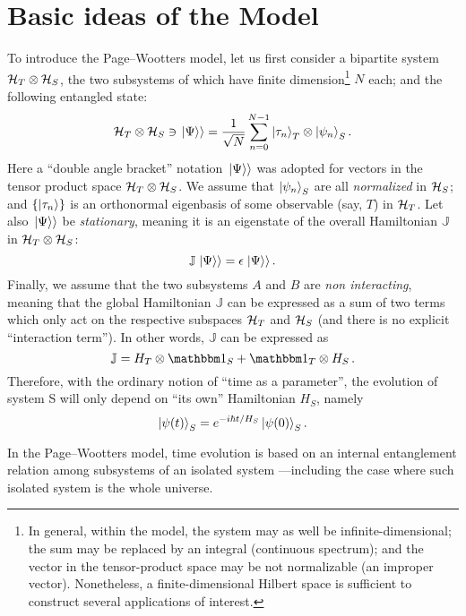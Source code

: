 \section{Basic ideas of the Model}

To introduce the Page--Wootters model, let us first consider
a bipartite system $\mathcal{H}_T \otimes \mathcal{H}_S$,
the two subsystems of which have finite dimension\footnote{
  In general, within the model,
  the system may as well be infinite-dimensional;
  the sum may be replaced by an integral (continuous spectrum);
  and the vector in the tensor-product space may be not normalizable (an improper vector).
  Nonetheless, a finite-dimensional Hilbert space is sufficient to construct several applications of interest.
} $N$ each;
and the following entangled state:
\begin{equation}\label{eq:pw:finite-entanglement}
  \mathcal{H}_T \otimes \mathcal{H}_S \ni \left.\left| \Psi \right\rangle\right\rangle
  =
  \frac{1}{\sqrt{N}} \sum_{n=0}^{N-1} \ket{\tau_{n}}_{T} \otimes \ket{\psi_{n}}_{S} \text{.}
\end{equation}
Here
a ``double angle bracket'' notation $\left.\left| \Psi \right\rangle\right\rangle$ was adopted
for vectors in the tensor product space $\mathcal{H}_T \otimes \mathcal{H}_S$.
We assume that $\ket{\psi_{n}}_{S}$ are all \emph{normalized} in $\mathcal{H}_S$;
and
$\qty{\ket{{\tau}_n}}$ is an orthonormal eigenbasis of some observable (say, $T$) in $\mathcal{H}_T$.
Let also $\left.\left| \Psi \right\rangle\right\rangle$ be \emph{stationary}, meaning it is an eigenstate
of the overall Hamiltonian $\mathbb{J}$ in $\mathcal{H}_T \otimes \mathcal{H}_S$:
$$
  \mathbb{J} \left.\left| \Psi \right\rangle\right\rangle = \epsilon \left.\left| \Psi \right\rangle\right\rangle \text{.}
$$
Finally, we assume that the two subsystems $A$ and $B$ are \emph{non interacting},
meaning that the global Hamiltonian $\mathbb{J}$ can be expressed as a sum of two terms
which only act on the respective subspaces $\mathcal{H}_T$ and $\mathcal{H}_S$
(and there is no explicit ``interaction term''). In other words,
$\mathbb{J}$ can be expressed as
$$
  \mathbb{J} = H_T \ox \idop_S + \idop_T \ox H_S \, \text{.} 
$$
Therefore, with the ordinary notion of ``time as a parameter'',
the evolution of system S will only depend on ``its own'' Hamiltonian $H_S$, namely
\begin{equation}\label{eq:pw:ordinary_S}
  \ket{\psi(t)}_S = e^{- i \hbar t / H_S } \ket{\psi(0)}_S \text{.}  
\end{equation}
 
In the Page--Wootters model, time evolution is based on an internal entanglement
relation among subsystems of an isolated system
---including the case where such isolated system is the whole universe.

